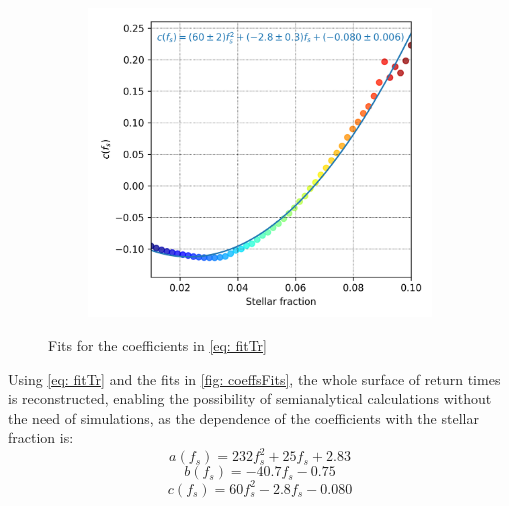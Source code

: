 \begin{figure}[h]
\begin{subfigure}[t]{0.4\textwidth}
				\caption{}
			\end{subfigure}
			\begin{subfigure}[t]{0.4\textwidth}
				\includegraphics[width=\textwidth]{"../Files/Week 10/c"}
				\caption{}
			\end{subfigure}
			\caption{Fits for the coefficients in \autoref{eq: fitTr}}
			\label{fig: coeffsFits}
		\end{figure}

	Using \autoref{eq: fitTr} and the fits in \autoref{fig: coeffsFits}, the whole surface of return times is reconstructed, enabling the possibility of semianalytical calculations without the need of simulations, as the dependence of the coefficients with the stellar fraction is:
	\begin{equation}
		a(f_s) = 232f_s^2 + 25 f_s + 2.83
	\end{equation} 
	\begin{equation}
		b(f_s) = -40.7 f_s - 0.75
	\end{equation}
	\begin{equation}
		c(f_s) = 60 f_s^2 - 2.8 f_s - 0.080
	\end{equation}

